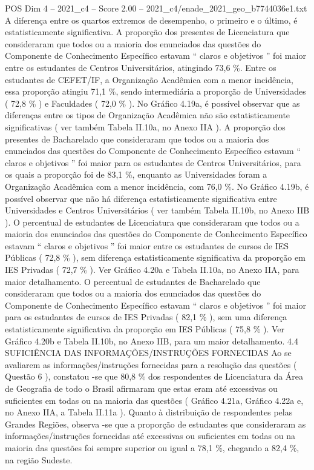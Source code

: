 \begin{textsample}{POS Dim 4 – 2021\_c4 – Score 2.00 – 2021\_c4/enade\_2021\_geo\_b7744036e1.txt}
A diferença entre os quartos extremos de desempenho, o primeiro e o último, é estatisticamente significativa.
A proporção dos presentes de Licenciatura que consideraram que todos ou a maioria dos enunciados das questões do Componente de Conhecimento Específico estavam “ claros e objetivos ” foi maior entre os estudantes de Centros Universitários, atingindo 73,6 \%.
Entre os estudantes de CEFET/IF, a Organização Acadêmica com a menor incidência, essa proporção atingiu 71,1 \%, sendo intermediária a proporção de Universidades ( 72,8 \% ) e Faculdades ( 72,0 \% ).
No Gráfico 4.19a, é possível observar que as diferenças entre os tipos de Organização Acadêmica não são estatisticamente significativas ( ver também Tabela II.10a, no Anexo IIA ).
A proporção dos presentes de Bacharelado que consideraram que todos ou a maioria dos enunciados das questões do Componente de Conhecimento Específico estavam “ claros e objetivos ” foi maior para os estudantes de Centros Universitários, para os quais a proporção foi de 83,1 \%, enquanto as Universidades foram a Organização Acadêmica com a menor incidência, com 76,0 \%.
No Gráfico 4.19b, é possível observar que não há diferença estatisticamente significativa entre Universidades e Centros Universitários ( ver também Tabela II.10b, no Anexo IIB ).
O percentual de estudantes de Licenciatura que consideraram que todos ou a maioria dos enunciados das questões do Componente de Conhecimento Específico estavam “ claros e objetivos ” foi maior entre os estudantes de cursos de IES Públicas ( 72,8 \% ), sem diferença estatisticamente significativa da proporção em IES Privadas ( 72,7 \% ).
Ver Gráfico 4.20a e Tabela II.10a, no Anexo IIA, para maior detalhamento.
O percentual de estudantes de Bacharelado que consideraram que todos ou a maioria dos enunciados das questões do Componente de Conhecimento Específico estavam “ claros e objetivos ” foi maior para os estudantes de cursos de IES Privadas ( 82,1 \% ), sem uma diferença estatisticamente significativa da proporção em IES Públicas ( 75,8 \% ).
Ver Gráfico 4.20b e Tabela II.10b, no Anexo IIB, para um maior detalhamento. 4.4 SUFICIÊNCIA DAS INFORMAÇÕES/INSTRUÇÕES FORNECIDAS Ao se avaliarem as informações/instruções fornecidas para a resolução das questões ( Questão 6 ), constatou -se que 80,8 \% dos respondentes de Licenciatura da Área de Geografia de todo o Brasil afirmaram que estas eram até excessivas ou suficientes em todas ou na maioria das questões ( Gráfico 4.21a, Gráfico 4.22a e, no Anexo IIA, a Tabela II.11a ).
Quanto à distribuição de respondentes pelas Grandes Regiões, observa -se que a proporção de estudantes que consideraram as informações/instruções fornecidas até excessivas ou suficientes em todas ou na maioria das questões foi sempre superior ou igual a 78,1 \%, chegando a 82,4 \%, na região Sudeste.

\end{textsample}
